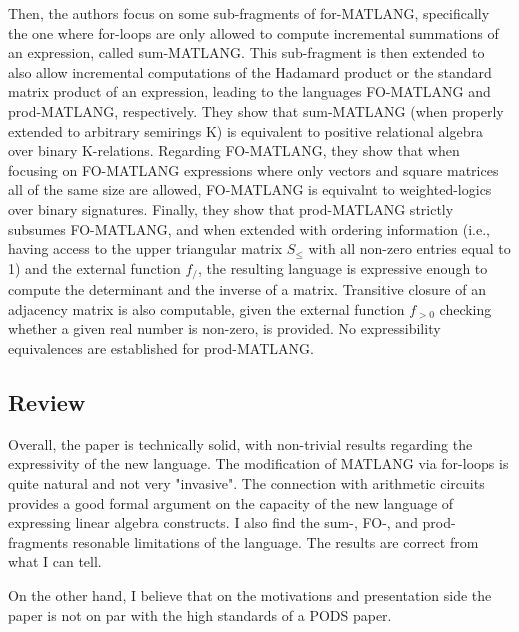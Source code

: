 \documentclass[a4paper]{article}
\begin{document}
Then, the authors focus on some sub-fragments of for-MATLANG, specifically the one where for-loops are only allowed to compute 
incremental summations of an expression, called sum-MATLANG. This sub-fragment is then extended to also allow incremental 
computations of the Hadamard product or the standard matrix product of an expression, leading to the languages FO-MATLANG and 
prod-MATLANG, respectively.
They show that sum-MATLANG (when properly extended to arbitrary semirings K) is equivalent to positive relational algebra over 
binary K-relations.
Regarding FO-MATLANG, they show that when focusing on FO-MATLANG expressions where only vectors and square matrices all of the 
same size are allowed, FO-MATLANG is equivalnt to weighted-logics over binary signatures.
Finally, they show that prod-MATLANG strictly subsumes FO-MATLANG, and when extended with ordering information (i.e., having 
access to the upper triangular matrix $S_\leq$ with all non-zero entries equal to 1) and the external function $f_/$, the resulting language is expressive enough to compute the determinant and the inverse of a matrix. Transitive closure of an adjacency matrix is also computable, given the external function $f_{>0}$ checking whether a given real number is non-zero, is provided.
No expressibility equivalences are established for prod-MATLANG.

\subsection*{Review}

Overall, the paper is technically solid, with non-trivial results regarding the expressivity of the new language.
The modification of MATLANG via for-loops is quite natural and not very "invasive". The connection with arithmetic circuits 
provides a good formal argument on the capacity of the new language of expressing linear algebra constructs.
I also find the sum-, FO-, and prod- fragments resonable limitations of the language. The results are correct from what I can tell.

On the other hand, I believe that on the motivations and presentation side the paper is not on par with the high standards of a 
PODS paper.
\end{document}
